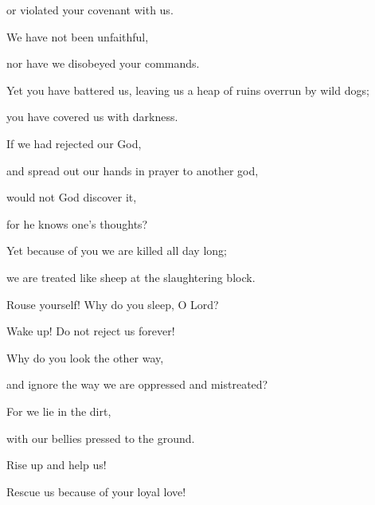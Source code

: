{\par }{\Q or
violated
your covenant with us.
\par }{\Q {}We have not
been unfaithful,
\par }{\Q nor have we disobeyed
your commands.
\par }{\Q {}Yet
you have battered
us, leaving us a heap of ruins
overrun by wild dogs;
\par }{\Q you have covered
us with
darkness.
\par }{\Q {}If
we had rejected
our God,
\par }{\Q and spread out
our hands
in prayer to another
god,
\par }{\Q {}would not
God
discover
it,
\par }{\Q for
he knows
one’s
thoughts?
\par }{\Q {}Yet because
of you we are killed
all
day
long;
\par }{\Q we are treated
like sheep
at the slaughtering block.
\par }{\Q {}Rouse
yourself! Why
do you sleep,
O Lord?
\par }{\Q Wake
up! Do not
reject
us forever!
\par }{\Q {}Why
do you look the other way,

\par }{\Q and ignore
the way we are oppressed
and mistreated?
\par }{\Q {}For
we lie in
the dirt,
\par }{\Q with
our bellies
pressed to the ground.
\par }{\Q {}Rise
up and help
us!
\par }{\Q Rescue
us because
of your loyal love!


\par }
